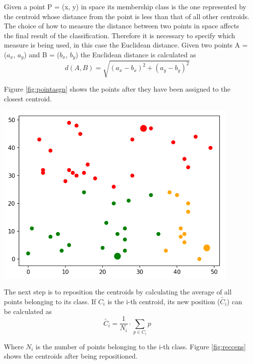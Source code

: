 \documentclass{report}
\begin{document}
\begin{minipage}[b]{0.48\textwidth}
    Given a point P = (x, y) in space its membership class is the one represented by the centroid whose distance from the point is less than that of all other centroids. The choice of how to measure the distance between two points in space affects the final result of the classification. Therefore it is necessary to specify which measure is being used, in this case the Euclidean distance. Given two points A = ($a_x$, $a_y$) and B = ($b_x$, $b_y$) the Euclidean distance is calculated as
  \begin{equation}
      d(A, B) = \sqrt{(a_x - b_x)^2 + (a_y - b_y)^2}
  \end{equation}

  Figure \ref{fig:pointasgn} shows the points after they have been assigned to the closest centroid.

  \begin{center}    
      \includegraphics[width = 0.9\textwidth]{imgs/asgnpoints.png}
      \label{fig:pointasgn}
  \end{center}

  The next step is to reposition the centroids by calculating the average of all points belonging to its class. If $C_i$ is the i-th centroid, its new position ($\tilde{C_i}$) can be calculated as
  \begin{equation}
      \tilde{C_i} = \frac{1}{N_i}\cdot \sum_{p \in C_i} p
      \label{eq:centrep}
  \end{equation}

  Where $N_i$ is the number of points belonging to the i-th class.
  Figure \ref{fig:reccens} shows the centroids after being repositioned. 
  

\end{minipage}
\end{document}
